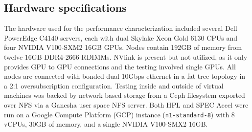 \documentclass[conference]{IEEEtran}
\begin{document}
\subsection{Hardware specifications}\label{sec:hardspec}
The hardware used for the performance characterization included several Dell PowerEdge C4140 servers, each with dual Skylake Xeon Gold 6130 \cite{skylake} CPUs and four NVIDIA V100-SXM2 16GB \cite{v100-specs} GPUs. Nodes contain 192GB of memory from twelve 16GB DDR4-2666 RDIMMs. NVlink is present but not utilized, as it only provides GPU to GPU connections and the testing involved single GPUs. All nodes are connected with bonded dual 10Gbps ethernet in a fat-tree topology in a 2:1 oversubscription configuration. Testing inside and outside of virtual machines was backed by network based storage from a Ceph filesystem exported over NFS via a Ganesha user space NFS server. Both HPL and SPEC Accel were run on a Google Compute Platform (GCP) instance ({\tt n1-standard-8}) with 8 vCPUs, 30GB of memory, and a single NVIDIA V100-SMX2 16GB.
\end{document}
